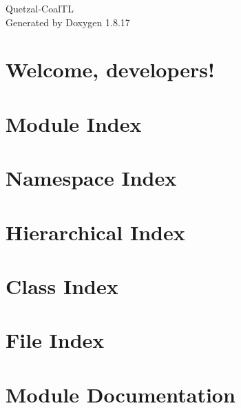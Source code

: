 \let\mypdfximage\pdfximage\def\pdfximage{\immediate\mypdfximage}\documentclass[twoside]{book}
\newcommand{\+}{\discretionary{\mbox{\scriptsize$\hookleftarrow$}}{}{}}
\newcommand{\clearemptydoublepage}{%
  \newpage{\pagestyle{empty}\cleardoublepage}%
}
\begin{document}
\hypersetup{pageanchor=false,
             bookmarksnumbered=true,
             pdfencoding=unicode
            }
\begin{titlepage}
\vspace*{7cm}
\begin{center}%
{\Large Quetzal-\/\+Coal\+TL }\\
\vspace*{1cm}
{\large Generated by Doxygen 1.8.17}\\
\end{center}
\end{titlepage}
\clearemptydoublepage
{}
\tableofcontents
\clearemptydoublepage
{}
\hypersetup{pageanchor=true}

\chapter{Welcome, developers!}
\label{index}\hypertarget{index}{}
\chapter{Module Index}

\chapter{Namespace Index}

\chapter{Hierarchical Index}

\chapter{Class Index}

\chapter{File Index}

\chapter{Module Documentation}










\end{document}
